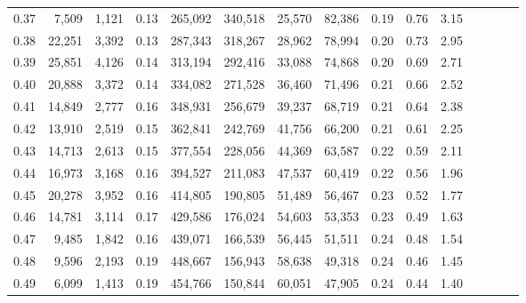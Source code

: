 \begin{tabular}{rrrcrrrrrrrrrrr}
0.37 &   7,509 &  1,121 &                                       0.13 &  265,092 &  340,518 &   25,570 &   82,386 &  0.19 &  0.76 &                         3.15 \\
0.38 &  22,251 &  3,392 &                                       0.13 &  287,343 &  318,267 &   28,962 &   78,994 &  0.20 &  0.73 &                         2.95 \\
0.39 &  25,851 &  4,126 &                                       0.14 &  313,194 &  292,416 &   33,088 &   74,868 &  0.20 &  0.69 &                         2.71 \\
0.40 &  20,888 &  3,372 &                                       0.14 &  334,082 &  271,528 &   36,460 &   71,496 &  0.21 &  0.66 &                         2.52 \\
0.41 &  14,849 &  2,777 &                                       0.16 &  348,931 &  256,679 &   39,237 &   68,719 &  0.21 &  0.64 &                         2.38 \\
0.42 &  13,910 &  2,519 &                                       0.15 &  362,841 &  242,769 &   41,756 &   66,200 &  0.21 &  0.61 &                         2.25 \\
0.43 &  14,713 &  2,613 &                                       0.15 &  377,554 &  228,056 &   44,369 &   63,587 &  0.22 &  0.59 &                         2.11 \\
0.44 &  16,973 &  3,168 &                                       0.16 &  394,527 &  211,083 &   47,537 &   60,419 &  0.22 &  0.56 &                         1.96 \\
0.45 &  20,278 &  3,952 &                                       0.16 &  414,805 &  190,805 &   51,489 &   56,467 &  0.23 &  0.52 &                         1.77 \\
0.46 &  14,781 &  3,114 &                                       0.17 &  429,586 &  176,024 &   54,603 &   53,353 &  0.23 &  0.49 &                         1.63 \\
0.47 &   9,485 &  1,842 &                                       0.16 &  439,071 &  166,539 &   56,445 &   51,511 &  0.24 &  0.48 &                         1.54 \\
0.48 &   9,596 &  2,193 &                                       0.19 &  448,667 &  156,943 &   58,638 &   49,318 &  0.24 &  0.46 &                         1.45 \\
0.49 &   6,099 &  1,413 &                                       0.19 &  454,766 &  150,844 &   60,051 &   47,905 &  0.24 &  0.44 &                         1.40 \\

\end{tabular}
